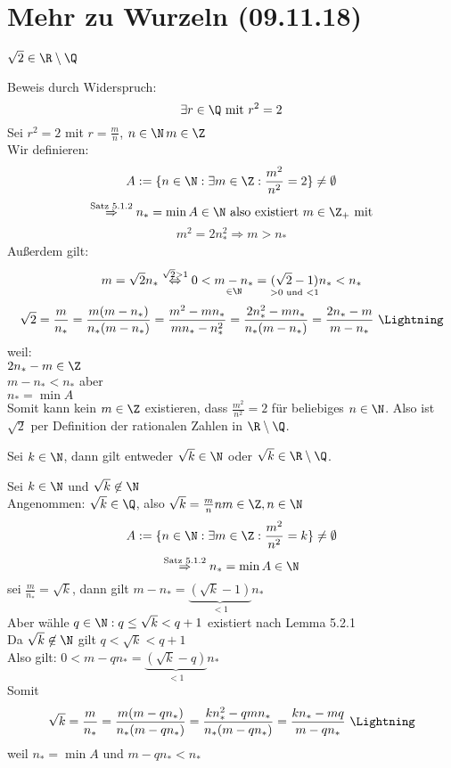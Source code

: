 \documentclass[12pt,a4paper,titlepage,draft]{article}
\begin{document}
	\section{Mehr zu Wurzeln (09.11.18)}
	\begin{bsp} [Exkurs]
		\begin{beh}
			\(\sqrt{2} \in \R \setminus \Q\)
		\end{beh}
		\begin{bew}
			Beweis durch Widerspruch:
			\[\exists r \in \Q \text{ mit } r^2 = 2\]
			Sei \(r^2 = 2\) mit \(r = \frac{m}{n}\), \(n \in \N\, m \in \Z\)\\
			Wir definieren:
			\[A := \{n \in \N: \exists m \in \Z: \frac{m^2}{n^2} = 2\} \neq \emptyset\]
			\[\overset{\text{Satz 5.1.2}}{\Rightarrow} n_* = \min A \in \N \text{ also existiert } m \in \Z_+ \text{ mit}\]
			\[m^2 = 2n_*^2 \Rightarrow m > n_* \]
			Außerdem gilt:
			\[m = \sqrt{2}n_* \overset{\sqrt{2} > 1}{\Leftrightarrow} 0 < \underset{\in \N}{m - n_*} = \underset{> 0 \text{ und } < 1}{(\sqrt{2} - 1)}n_* < n_*\]
			\[\sqrt{2} = \frac{m}{n_*} = \frac{m(m - n_*)}{n_*(m - n_*)} = \frac{m^2 - mn_*}{mn_* - n_*^2} = \frac{2n_*^2 - mn_*}{n_*(m-n_*)} = \frac{2n_*-m}{m-n_*} \text{ \Lightning}\]
			weil:\\
			\(2n_* - m \in \Z\)\\
			\(m - n_* < n_*\) aber\\
			\(n_* = \min A\)\\
			Somit kann kein \(m \in \Z\) existieren, dass \(\frac{m^2}{n^2} = 2\) für beliebiges \(n \in \N\). Also ist \(\sqrt{2}\) per Definition der rationalen Zahlen in \(\R \setminus \Q\).
		\end{bew}
		\begin{satz}
			Sei \(k \in \N\), dann gilt entweder \(\sqrt{k} \in \N\) oder \(\sqrt{k} \in \R \setminus \Q\).
		\end{satz}
		\begin{bew}
			Sei \(k \in \N\) und \(\sqrt{k} \not\in \N\)\\
			Angenommen: \(\sqrt{k} \in \Q\), also \(\sqrt{k} = \frac{m}{n}n m \in \Z, n \in \N\)\\
			\[A := \{n \in \N: \exists m \in \Z: \frac{m^2}{n^2} = k\} \neq \emptyset\]
			\[\overset{\text{Satz 5.1.2}}{\Rightarrow} n_* = \min A \in \N\]
			sei \(\frac{m}{n_*} = \sqrt{k}\), dann gilt \(m - n_* = \underbrace{(\sqrt{k}-1)}_{<1}n_*\)\\
			Aber wähle \(q \in \N: q \leq \sqrt{k} < q + 1\) existiert nach Lemma 5.2.1\\
			Da \(\sqrt{k} \not \in \N\) gilt \(q < \sqrt{k} < q + 1\)\\
			Also gilt: \(0 < m - qn_* = \underbrace{(\sqrt{k}-q)}_{<1}n_*\)\\
			Somit
			\[\sqrt{k} = \frac{m}{n_*} = \frac{m(m - qn_*)}{n_*(m - qn_*)} = \frac{kn_*^2 - qmn_*}{n_*(m-qn_*)} = \frac{kn_* - mq}{m - qn_*} \text{ \Lightning}\]
			weil \(n_* = \min A\) und \(m - qn_* < n_*\)
		\end{bew}
	\end{bsp}
\end{document}
